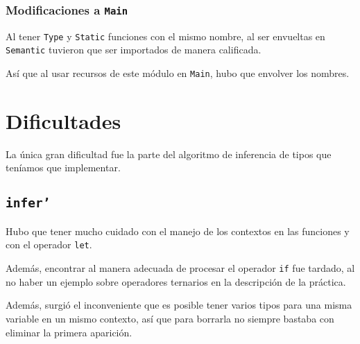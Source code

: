 \documentclass{article}
\begin{document}
    \subsubsection{Modificaciones a \texttt{Main}}

    Al tener \texttt{Type} y \texttt{Static} funciones con el mismo nombre, al
    ser envueltas en \texttt{Semantic} tuvieron que ser importados de manera
    calificada.

    Así que al usar recursos de este módulo en \texttt{Main}, hubo que envolver
    los nombres.

    \section{Dificultades}

    La única gran dificultad fue la parte del algoritmo de inferencia de tipos
    que teníamos que implementar.

    \subsection{\texttt{infer'}}

    Hubo que tener mucho cuidado con el manejo de los contextos en las funciones
    y con el operador \texttt{let}.

    Además, encontrar al manera adecuada de procesar el operador \texttt{if} fue
    tardado, al no haber un ejemplo sobre operadores ternarios en la descripción
    de la práctica.

    Además, surgió el inconveniente que es posible tener varios tipos para una
    misma variable en un mismo contexto, así que para borrarla no siempre bastaba
    con eliminar la primera aparición.
\end{document}
